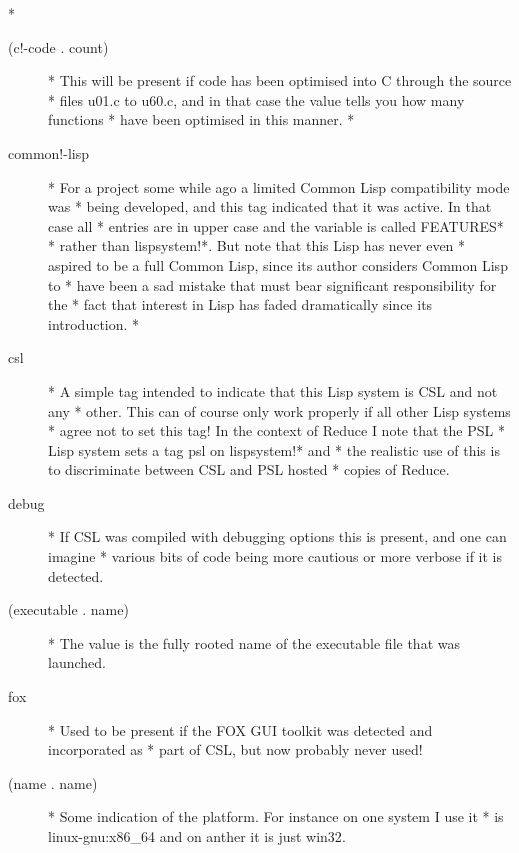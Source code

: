 \documentclass[a4paper,11pt]{article}
\begin{document}
  * \begin{description}

\item[{\ttfamily (c!-code . count)}] 
      * This will be present if code has been optimised into C through the source
      * files u01.c to u60.c, and in that case the value tells you how many functions
      * have been optimised in this manner.
      *

\item[{\ttfamily  common!-lisp}] 
      * For a project some while ago a limited Common Lisp compatibility mode was
      * being developed, and this tag indicated that it was active. In that case all
      * entries are in upper case and the variable is called {\ttfamily *FEATURES*}
      * rather than {\ttfamily lispsystem!*}. But note that this Lisp has never even
      * aspired to be a full Common Lisp, since its author considers Common Lisp to
      * have been a sad mistake that must bear significant responsibility for the
      * fact that interest in Lisp has faded dramatically since its introduction.
      *

\item[{\ttfamily csl}] 
      * A simple tag intended to indicate that this Lisp system is CSL and not any
      * other. This can of course only work properly if all other Lisp systems
      * agree not to set this tag! In the context of Reduce I note that the PSL
      * Lisp system sets a tag {\ttfamily psl} on {\ttfamily lispsystem!*} and
      * the realistic use of this is to discriminate between CSL and PSL hosted
      * copies of Reduce.

\item[{\ttfamily debug}] 
      * If CSL was compiled with debugging options this is present, and one can imagine
      * various bits of code being more cautious or more verbose if it is detected.

\item[{\ttfamily  (executable . name)}] 
      * The value is the fully rooted name of the executable file that was launched.

\item[{\ttfamily fox}] 
      * Used to be present if the FOX GUI toolkit was detected and incorporated as
      * part of CSL, but now probably never used!

\item[{\ttfamily  (name . name)}] 
      * Some indication of the platform. For instance on one system I use it
      * is {\ttfamily linux-gnu:x86\_64} and on anther it is just {\ttfamily win32}.


\end{description}
\end{document}
